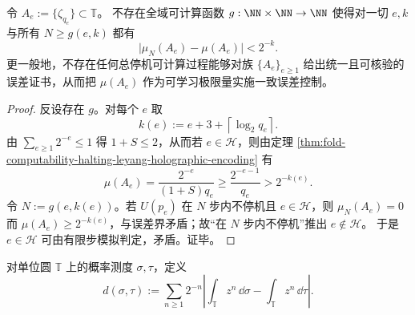 \begin{corollary}[弱收敛存在但不存在可计算收敛模]\label{cor:fold-computability-halting-no-computable-modulus}
令 \(A_e:=\{\zeta_{q_e}\}\subset\mathbb T\)。
不存在全域可计算函数 \(g:\NN\times\NN\to\NN\) 使得对一切 \(e,k\) 与所有 \(N\ge g(e,k)\) 都有
\[
\bigl|\mu_N(A_e)-\mu(A_e)\bigr|<2^{-k}.
\]
更一般地，不存在任何总停机可计算过程能够对族 \(\{A_e\}_{e\ge 1}\) 给出统一且可核验的误差证书，从而把 \(\mu(A_e)\) 作为可学习极限量实施一致误差控制。
\end{corollary}
\begin{proof}
反设存在 \(g\)。对每个 \(e\) 取
\[
k(e):=e+3+\left\lceil\log_2 q_e\right\rceil.
\]
由 \(\sum_{e\ge 1}2^{-e}\le 1\) 得 \(1+S\le 2\)，从而若 \(e\in\mathcal H\)，则由定理 \ref{thm:fold-computability-halting-leyang-holographic-encoding} 有
\[
\mu(A_e)=\frac{2^{-e}}{(1+S)q_e}\ge \frac{2^{-e-1}}{q_e}>2^{-k(e)}.
\]
令 \(N:=g(e,k(e))\)。若 \(U(p_e)\) 在 \(N\) 步内不停机且 \(e\in\mathcal H\)，则 \(\mu_N(A_e)=0\) 而 \(\mu(A_e)\ge 2^{-k(e)}\)，与误差界矛盾；故“在 \(N\) 步内不停机”推出 \(e\notin\mathcal H\)。
于是 \(e\in\mathcal H\) 可由有限步模拟判定，矛盾。证毕。
\end{proof}

\begin{definition}\label{def:fold-computability-fourier-moment-metric}
对单位圆 \(\mathbb T\) 上的概率测度 \(\sigma,\tau\)，定义
\[
d(\sigma,\tau):=\sum_{n\ge 1}2^{-n}\left|\int_{\mathbb T}z^n\,\dd\sigma-\int_{\mathbb T}z^n\,\dd\tau\right|.
\]
\end{definition}

